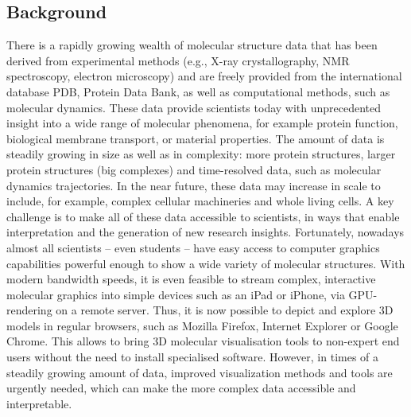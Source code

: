 \documentclass[a4paper]{article}
\begin{document}
\subsection{Background}
There is a rapidly growing wealth of molecular structure data that has been derived from experimental methods (e.g., X-ray crystallography, NMR spectroscopy, electron microscopy) and are freely provided from the international database PDB, Protein Data Bank, as well as computational methods, such as molecular dynamics. These data provide scientists today with unprecedented insight into a wide range of molecular phenomena, for example protein function, biological membrane transport, or material properties.
The amount of data is steadily growing in size as well as in complexity: more protein structures, larger protein structures (big complexes) and time-resolved data, such as molecular dynamics trajectories. In the near future, these data may increase in scale to include, for example, complex cellular machineries and whole living cells. A key challenge is to make all of these data accessible to scientists, in ways that enable interpretation and the generation of new research insights.
Fortunately, nowadays almost all scientists -- even students -- have easy access to computer graphics capabilities powerful enough to show a wide variety of molecular structures. With modern bandwidth speeds, it is even feasible to stream complex, interactive molecular graphics into simple devices such as an iPad or iPhone, via GPU-rendering on a remote server. Thus, it is now possible to depict and explore 3D models in regular browsers, such as Mozilla Firefox, Internet Explorer or Google Chrome. This allows to bring 3D molecular visualisation tools to non-expert end users without the need to install specialised software. However, in times of a steadily growing amount of data, improved visualization methods and tools are urgently needed, which can make the more complex data accessible and interpretable.
 
\end{document}

